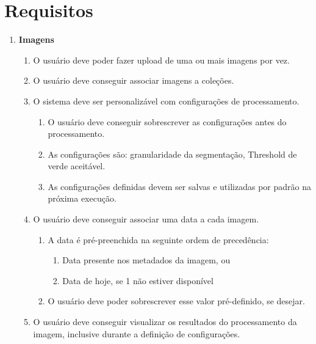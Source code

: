 \renewcommand{\theenumi}{\arabic{enumi}}
\renewcommand{\theenumii}{\theenumi.\arabic{enumii}}
\renewcommand{\theenumiii}{\theenumii.\arabic{enumiii}}
\renewcommand{\labelenumiv}{\theenumiii.\arabic{enumiv}}


\chapter{Requisitos}

\begin{enumerate}
    \item \textbf{Imagens}
    \begin{enumerate}
        \item O usuário deve poder fazer upload de uma ou mais imagens por vez.
        \item O usuário deve conseguir associar imagens a coleções.
        \item O sistema deve ser personalizável com configurações de processamento.
        \begin{enumerate}
            \item O usuário deve conseguir sobrescrever as configurações antes do processamento. 
            \item As configurações são: granularidade da segmentação, Threshold de verde aceitável.
            \item As configurações definidas devem ser salvas e utilizadas por padrão na próxima execução.
        \end{enumerate}
        \item O usuário deve conseguir associar uma data a cada imagem.
        \begin{enumerate}
            \item A data é pré-preenchida na seguinte ordem de precedência:
            \begin{enumerate}
                \item Data presente nos metadados da imagem, ou
                \item Data de hoje, se 1 não estiver disponível
            \end{enumerate}
            \item O usuário deve poder sobrescrever esse valor pré-definido, se desejar.
        \end{enumerate}
        \item O usuário deve conseguir visualizar os resultados do processamento da imagem, inclusive durante a definição de configurações.

\end{enumerate}
\end{enumerate}
